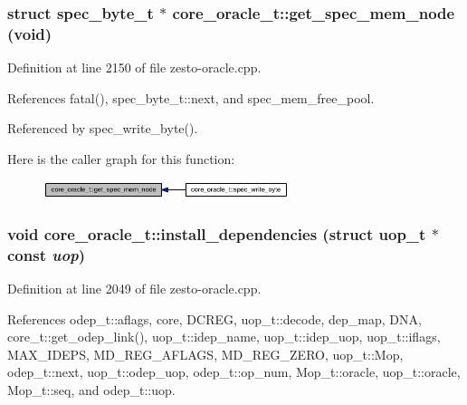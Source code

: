 \subsubsection[{get\_\-spec\_\-mem\_\-node}]{\setlength{\rightskip}{0pt plus 5cm}struct {\bf spec\_\-byte\_\-t} $\ast$ core\_\-oracle\_\-t::get\_\-spec\_\-mem\_\-node (void)\hspace{0.3cm}{\tt  [read, protected]}}\label{classcore__oracle__t_b4d62e47b0d6399f7fc7738eb0864f17}




Definition at line 2150 of file zesto-oracle.cpp.

References fatal(), spec\_\-byte\_\-t::next, and spec\_\-mem\_\-free\_\-pool.

Referenced by spec\_\-write\_\-byte().

Here is the caller graph for this function:\nopagebreak
\begin{figure}[H]
\begin{center}
\leavevmode
\includegraphics[width=203pt]{classcore__oracle__t_b4d62e47b0d6399f7fc7738eb0864f17_icgraph}
\end{center}
\end{figure}
\subsubsection[{install\_\-dependencies}]{\setlength{\rightskip}{0pt plus 5cm}void core\_\-oracle\_\-t::install\_\-dependencies (struct {\bf uop\_\-t} $\ast$const  {\em uop})\hspace{0.3cm}{\tt  [protected]}}\label{classcore__oracle__t_deeae95a29f95000a81b20fb895a2e64}




Definition at line 2049 of file zesto-oracle.cpp.

References odep\_\-t::aflags, core, DCREG, uop\_\-t::decode, dep\_\-map, DNA, core\_\-t::get\_\-odep\_\-link(), uop\_\-t::idep\_\-name, uop\_\-t::idep\_\-uop, uop\_\-t::iflags, MAX\_\-IDEPS, MD\_\-REG\_\-AFLAGS, MD\_\-REG\_\-ZERO, uop\_\-t::Mop, odep\_\-t::next, uop\_\-t::odep\_\-uop, odep\_\-t::op\_\-num, Mop\_\-t::oracle, uop\_\-t::oracle, Mop\_\-t::seq, and odep\_\-t::uop.

